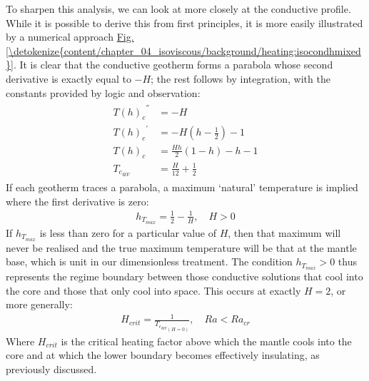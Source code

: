 \documentclass[letterpaper,10pt,english]{jupyterBook}
\begin{document}
\sphinxAtStartPar
To sharpen this analysis, we can look at more closely at the conductive profile. While it is possible to derive this from first principles, it is more easily illustrated by a numerical approach \hyperref[\detokenize{content/chapter_04_isoviscous/background/heating:isocondhmixed}]{Fig.\@ \ref{\detokenize{content/chapter_04_isoviscous/background/heating:isocondhmixed}}}. It is clear that the conductive geotherm forms a parabola whose second derivative is exactly equal to \(-H\); the rest follows by integration, with the constants provided by logic and observation:
\begin{equation*}
\begin{split} \begin{align*}
{{T(h)}_{c}}^{''} &= -H \\
{{T(h)}_{c}}^{'} &= -H \left( h - \frac{1}{2} \right) - 1 \\
{T(h)}_{c} &= \frac{Hh}{2} \left( 1 - h \right) - h - 1 \\
{{T}_{c}}_{av} &= \frac{H}{12} + \frac{1}{2}
\end{align*} \end{split}
\end{equation*}
\sphinxAtStartPar
If each geotherm traces a parabola, a maximum ‘natural’ temperature is implied where the first derivative is zero:
\begin{equation*}
\begin{split}
h_{T_{max}} = \frac{1}{2} - \frac{1}{H}, \quad H > 0
\end{split}
\end{equation*}
\sphinxAtStartPar
If \(h_{T_{max}}\) is less than zero for a particular value of \(H\), then that maximum will never be realised and the true maximum temperature will be that at the mantle base, which is unit in our dimensionless treatment. The condition \(h_{T_{max}} > 0\) thus represents the regime boundary between those conductive solutions that cool into the core and those that only cool into space. This occurs at exactly \(H = 2\), or more generally:
\begin{equation*}
\begin{split}
H_{crit} = \frac{1}{{{T_{c}}_{av}}_{(H=0)}}, \quad Ra < {Ra}_{cr}
\end{split}
\end{equation*}
\sphinxAtStartPar
Where \(H_{crit}\) is the critical heating factor above which the mantle cools into the core and at which the lower boundary becomes effectively insulating, as previously discussed.
\end{document}
